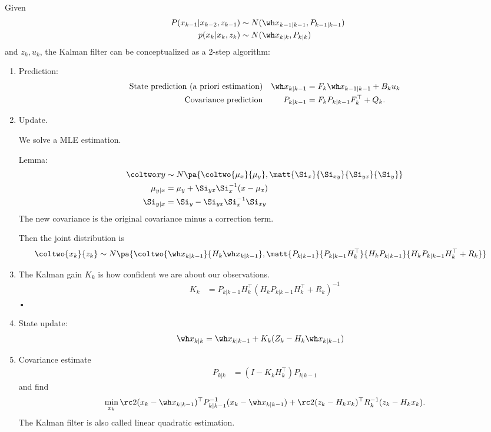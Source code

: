 Given 
\begin{align}
P(x_{k-1}|x_{k-2},z_{k-1})
&\sim N(\wh x_{k-1|k-1}, P_{k-1|k-1})\\
%
p(x_k|x_k,z_k) &\sim N( \wh x_{k|k}, P_{k|k})
\end{align}
and $z_k,u_k$, the Kalman filter can be conceptualized as a 2-step algorithm:
\begin{enumerate}
\item
Prediction: 
\begin{align}
\text{State prediction (a priori estimation)} &&\wh x_{k|k-1} &=F_k \wh x_{k-1|k-1} + B_k u_k\\
\text{Covariance prediction}&&
P_{k|k-1}&=F_k P_{k|k-1} F_k^\top + Q_k.
\end{align}
\item
Update.

We solve a MLE estimation.

Lemma:
\begin{align}
\coltwo xy &\sim N\pa{
\coltwo{\mu_x}{\mu_y}, \matt{\Si_x}{\Si_{xy}}{\Si_{yx}}{\Si_y}
}\\
\mu_{y|x} &= \mu_y + \Si_{yx} \Si_x^{-1}(x-\mu_x)\\
\Si_{y|x} &=\Si_y - \Si_{yx}\Si_x^{-1} \Si_{xy}
\end{align}
The new covariance is the original covariance minus a correction term.

Then the joint distribution is
\begin{align}
\coltwo{x_k}{z_k} &\sim
N\pa{
\coltwo{\wh x_{k|k-1}}{H_k \wh x_{k|k-1}},
\matt{P_{k|k-1}}{P_{k|k-1}H_k^\top}{H_k P_{k|k-1}}{H_k P_{k|k-1}H_k^\top +R_k}
}
\end{align}
\item
The Kalman gain $K_k$ is how confident we are about our observations.
\begin{align}
K_k &= P_{k|k-1} H_k^\top (H_k P_{k|k-1}H_k^\top +R_{k})^{-1}
\end{align}•
\item
State update: 
\begin{align}
\wh x_{k|k} &=\wh x_{k|k-1} + K_k(Z_k-H_k\wh x_{k|k-1}) 
\end{align}
\item
Covariance estimate 
\begin{align}
P_{k|k} &= (I-K_kH_k^\top ) P_{k|k-1}
\end{align}
and find
\begin{align}
\min_{x_k} \rc 2 (x_k - \wh x_{k|k-1})^\top P_{k|k-1}^{-1} (x_k - \wh x_{k|k-1}) + \rc 2(z_k - H_k x_k)^\top R_k^{-1}(z_k - H_k x_k).
\end{align}
The Kalman filter is also called linear quadratic estimation.
\end{enumerate}

